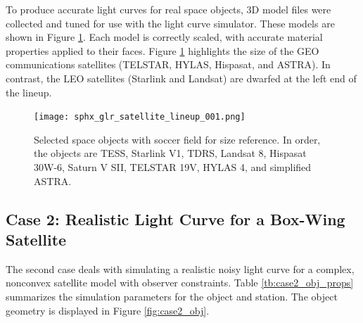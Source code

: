 To produce accurate light curves for real space objects, 3D model files were collected and tuned for use with the light curve simulator. These models are shown in Figure \ref{fig:satellite_lineup}. Each model is correctly scaled, with accurate material properties applied to their faces. Figure \ref{fig:satellite_lineup} highlights the size of the GEO communications satellites (TELSTAR, HYLAS, Hispasat, and ASTRA). In contrast, the LEO satellites (Starlink and Landsat) are dwarfed at the left end of the lineup.

\begin{figure}[ht]
    \centering
    \texttt{[image: sphx\_glr\_satellite\_lineup\_001.png]}
    \caption{Selected space objects with soccer field for size reference. In order, the objects are TESS, Starlink V1, TDRS, Landsat 8, Hispasat 30W-6, Saturn V SII, TELSTAR 19V, HYLAS 4, and simplified ASTRA.
    }
    \label{fig:satellite_lineup}
\end{figure}

\subsection{Case 2: Realistic Light Curve for a Box-Wing Satellite} \label{sec:case2}

The second case deals with simulating a realistic noisy light curve for a complex, nonconvex satellite model with observer constraints. Table \ref{tb:case2_obj_props} summarizes the simulation parameters for the object and station. The object geometry is displayed in Figure \ref{fig:case2_obj}.

